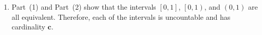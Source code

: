 \documentclass[11pt]{article}
\begin{document}
\begin{enumerate}
\begin{enumerate}
\item Since $g$ is a bijection, we conclude that $\left[0, 1 \right) \approx \left( 0, 1 \right)$.
\end{enumerate}

\item Part~(1) and Part~(2) show that the intervals $\left[0, 1 \right]$, $\left[0, 1 \right)$, and $\left(0, 1 \right)$ are all equivalent.  Therefore, each of the intervals is uncountable and has cardinality $\boldsymbol{c}$.


\end{enumerate}
\end{document}
